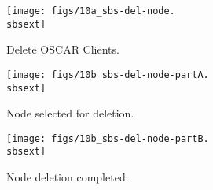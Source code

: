
\begin{figure}[htbp]
  \begin{center}
    \texttt{[image: figs/10a\_sbs-del-node.\\sbsext]}
    \caption{Delete OSCAR Clients.}
    \label{fig:sbs-del-node1}
  \end{center}
\end{figure}


\begin{figure}[htbp]
  \begin{center}
    \texttt{[image: figs/10b\_sbs-del-node-partA.\\sbsext]}
    \caption{Node selected for deletion.}
    \label{fig:sbs-del-node1-done-partA}
  \end{center}
\end{figure}

\begin{figure}[htbp]
  \begin{center}
    \texttt{[image: figs/10b\_sbs-del-node-partB.\\sbsext]}
    \caption{Node deletion completed.}
    \label{fig:sbs-del-node1-done-partB}
  \end{center}
\end{figure}




